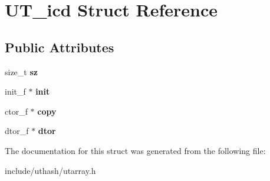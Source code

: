 \hypertarget{struct_u_t__icd}{}\section{U\+T\+\_\+icd Struct Reference}
\label{struct_u_t__icd}
\subsection*{Public Attributes}
\begin{DoxyCompactItemize}
\item 
\mbox{\label{struct_u_t__icd_a7021fa86e4197995817c9682140c2c82}} 
size\+\_\+t {\bfseries sz}
\item 
\mbox{\label{struct_u_t__icd_a4efb7d75484d26a649038a991329cfd1}} 
init\+\_\+f $\ast$ {\bfseries init}
\item 
\mbox{\label{struct_u_t__icd_af58b65eb0c3c21a99dc31c61f996408b}} 
ctor\+\_\+f $\ast$ {\bfseries copy}
\item 
\mbox{\label{struct_u_t__icd_ab1e1f6d1a48da57ff8e42b267dccedab}} 
dtor\+\_\+f $\ast$ {\bfseries dtor}
\end{DoxyCompactItemize}


The documentation for this struct was generated from the following file\+:\begin{DoxyCompactItemize}
\item 
include/uthash/utarray.\+h\end{DoxyCompactItemize}
